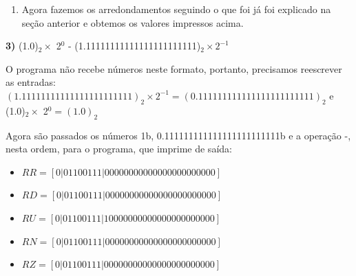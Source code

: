 \documentclass[11pt]{article}
\begin{document}
\begin{enumerate}
  \item Agora fazemos os arredondamentos seguindo o que foi já foi explicado na seção anterior e obtemos os valores impressos acima.
\end{enumerate}

\textbf{3)} (1.0)$_2  \times $ 2$^0$ - (1.11111111111111111111111)$_2 \times 2^{-1} $

O programa não recebe números neste formato, portanto, precisamos reescrever as entradas:
$(1.11111111111111111111111)_2 \times 2^{-1} = (0.111111111111111111111111)_2$ e
(1.0)$_2  \times $ 2$^0 = (1.0)_2$

Agora são passados os números 1b, 0.111111111111111111111111b e a operação -, nesta ordem, para o programa, que imprime de saída:

\begin{itemize}
  \item {\small$ RR = [ 0 | 0 1 1 0 0 1 1 1 | 0 0 0 0 0 0 0 0 0 0 0 0 0 0 0 0 0 0 0 0 0 0 0 ] $}
  \item {\small$ RD = [ 0 | 0 1 1 0 0 1 1 1 | 0 0 0 0 0 0 0 0 0 0 0 0 0 0 0 0 0 0 0 0 0 0 0 ] $}
  \item {\small$ RU = [ 0 | 0 1 1 0 0 1 1 1 | 1 0 0 0 0 0 0 0 0 0 0 0 0 0 0 0 0 0 0 0 0 0 0 ] $}
  \item {\small$ RN = [ 0 | 0 1 1 0 0 1 1 1 | 0 0 0 0 0 0 0 0 0 0 0 0 0 0 0 0 0 0 0 0 0 0 0 ] $}
  \item {\small$ RZ = [ 0 | 0 1 1 0 0 1 1 1 | 0 0 0 0 0 0 0 0 0 0 0 0 0 0 0 0 0 0 0 0 0 0 0 ] $}
\end{itemize}
\end{document}
